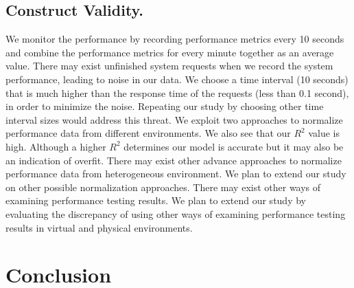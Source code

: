\documentclass[smallextended]{svjour3}       %
\begin{document}
\subsection{Construct Validity.}
We monitor the performance by recording performance metrics every 10 seconds and combine the performance metrics for every minute together as an average value. There may exist unfinished system requests when we record the system performance, leading to noise in our data. We choose a time interval (10 seconds) that is much higher than the response time of the requests (less than 0.1 second), in order to minimize the noise. Repeating our study by choosing other time interval sizes would address this threat. We exploit two approaches to normalize performance data from different environments. We also see that our {$R^2$} value is high. Although a higher {$R^2$} determines our model is accurate but it may also be an indication of overfit. There may exist other advance approaches to normalize performance data from heterogeneous environment. We plan to extend our study on other possible normalization approaches. There may exist other ways of examining performance testing results. We plan to extend our study by evaluating the discrepancy of using other ways of examining performance testing results in virtual and physical environments.



\section{Conclusion}
\label{sec:conclusion}
\end{document}
